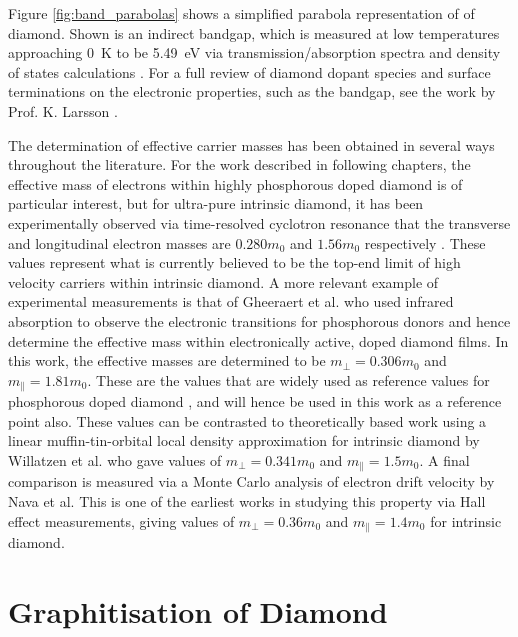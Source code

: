 \begin{refsection}
Figure \ref{fig:band_parabolas} shows a simplified parabola representation of of diamond. Shown is an indirect bandgap, which is measured at low temperatures approaching 0~\si{\kelvin} to be 5.49~\si{\electronvolt} via transmission/absorption spectra \cite{clark1964, Mildren2013} and density of states calculations \cite{Sellam23}. For a full review of diamond dopant species and surface terminations on the electronic properties, such as the bandgap, see the work by Prof. K. Larsson \cite{Larsson2020}.

The determination of effective carrier masses has been obtained in several ways throughout the literature. For the work described in following chapters, the effective mass of electrons within highly phosphorous doped diamond is of particular interest, but for ultra-pure intrinsic diamond, it has been experimentally observed via time-resolved cyclotron resonance that the transverse and longitudinal electron masses are $0.280m_{0}$ and $1.56m_{0}$ respectively \cite{Naka2013}. These values represent what is currently believed to be the top-end limit of high velocity carriers within intrinsic diamond. A more relevant example of experimental measurements is that of Gheeraert et al. \cite{Gheeraert2001} who used infrared absorption to observe the electronic transitions for phosphorous donors and hence determine the effective mass within electronically active, doped diamond films. In this work, the effective masses are determined to be $m_{\perp}=0.306m_{0}$ and $m_{\parallel} = 1.81m_{0}$. These are the values that are widely used as reference values for phosphorous doped diamond \cite{Pernot2006, Pernot2008}, and will hence be used in this work as a reference point also. These values can be contrasted to theoretically based work using a linear muffin-tin-orbital local density approximation for intrinsic diamond by Willatzen et al. who gave values of $m_{\perp}=0.341m_{0}$ and $m_{\parallel}=1.5m_{0}$. A final comparison is measured via a Monte Carlo analysis of electron drift velocity \cite{Nava1980} by Nava et al. This is one of the earliest works in studying this property via Hall effect measurements, giving values of $m_{\perp}=0.36m_{0}$ and $m_{\parallel}=1.4m_{0}$ for intrinsic diamond.

\section{Graphitisation of Diamond} %

\label{sec:laser} %


\end{refsection}
